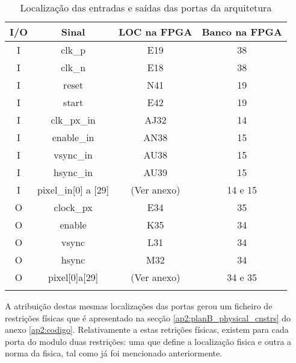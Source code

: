 \begin{longtable}[h!]
	{|c|c|c|c|}
	\hline
	\centering
		\textbf{I/O} & \textbf{Sinal}              & \textbf{LOC na FPGA} & \textbf{Banco na FPGA} \\ \hline \endhead
		I            & clk\_p                      & E19                  & 38                     \\ \hline
		I            & clk\_n                      & E18                  & 38                     \\ \hline
		I            & reset                       & N41                  & 19                     \\ \hline
		I            & start                       & E42                  & 19                     \\ \hline
		I            & clk\_px\_in                 & AJ32                 & 14                     \\ \hline
		I            & enable\_in                  & AN38                 & 15                     \\ \hline
		I            & vsync\_in                   & AU38                 & 15                     \\ \hline
		I            & hsync\_in                   & AU39                 & 15                     \\ \hline
		I            & pixel\_in{[}0{]} a {[}29{]} & (Ver anexo)          & 14 e 15                \\ \hline
		O            & clock\_px                   & E34                  & 35                     \\ \hline
		O            & enable                      & K35                  & 34                     \\ \hline
		O            & vsync                       & L31                  & 34                     \\ \hline
		O            & hsync                       & M32                  & 34                     \\ \hline
		O            & pixel{[}0{]}a{[}29{]}       & (Ver anexo)            & 34 e 35                \\ \hline
		\caption{Localização das entradas e saídas das portas da arquitetura}
	\label{table:LOCplanB_simples}
\end{longtable}


A atribuição destas mesmas localizações das portas gerou um ficheiro de restrições físicas que é apresentado na secção \ref{ap2:planB_physical_cnstrs} do anexo \ref{ap2:codigo}. Relativamente a estas retrições físicas, existem para cada porta do modulo duas restrições: uma que define a localização fisica e outra a norma da fisica, tal como já foi mencionado anteriormente. 

